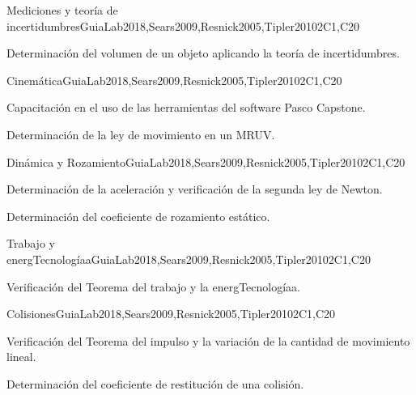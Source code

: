 \begin{syllabus}
\begin{competences}
    \item {}
\end{competences}

\begin{unit}{Mediciones y teoría de incertidumbres}{}{GuiaLab2018,Sears2009,Resnick2005,Tipler2010}{2}{C1,C20}
\begin{topics}
      \item Determinación del volumen de un objeto aplicando la teoría de incertidumbres.
\end{topics}
\end{unit}

\begin{unit}{Cinemática}{}{GuiaLab2018,Sears2009,Resnick2005,Tipler2010}{2}{C1,C20}
\begin{topics}
      \item Capacitación en el uso de las herramientas del software Pasco Capstone.
      \item Determinación de la ley de movimiento en un MRUV.
\end{topics}
\end{unit}

\begin{unit}{Dinámica y Rozamiento}{}{GuiaLab2018,Sears2009,Resnick2005,Tipler2010}{2}{C1,C20}
\begin{topics}
      \item Determinación de la aceleración y verificación de la segunda ley de Newton. 
      \item Determinación del coeficiente de rozamiento estático.
\end{topics}
\end{unit}

\begin{unit}{Trabajo y energTecnologíaa}{}{GuiaLab2018,Sears2009,Resnick2005,Tipler2010}{2}{C1,C20}
\begin{topics}
      \item Verificación del Teorema del trabajo y la energTecnologíaa.
   \end{topics}
\end{unit}

\begin{unit}{Colisiones}{}{GuiaLab2018,Sears2009,Resnick2005,Tipler2010}{2}{C1,C20}
\begin{topics}
	\item Verificación del Teorema del impulso y la variación de la cantidad de movimiento lineal. 
	\item Determinación del coeficiente de restitución de una colisión.
   \end{topics}
\end{unit}


\end{syllabus}
